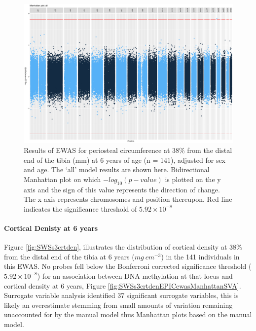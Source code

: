 \documentclass[
]{book}
\begin{document}
\begin{figure}

{\centering \includegraphics[width=0.8\linewidth]{figs/SWSs3pericEPICewasManhattanAll} 

}

\caption{Results of EWAS for periosteal circumference at 38\% from the distal end of the tibia (mm) at 6 years of age (n = 141), adjusted for sex and age. The `all' model results are shown here. Bidirectional Manhattan plot on which \(-log_{10}(p-value)\) is plotted on the y axis and the sign of this value represents the direction of change. The x axis represents chromosomes and position thereupon. Red line indicates the significance threshold of \(5.92\times10^{-8}\)}\label{fig:SWSs3pericEPICewasManhattanSVA}
\end{figure}



\hypertarget{cortical-denisty-at-6-years}{%
\paragraph{Cortical Denisty at 6 years}\label{cortical-denisty-at-6-years}}

Figure \ref{fig:SWSs3crtden}, illustrates the distribution of cortical density at 38\% from the distal end of the tibia at 6 years (\(mg~cm^{-3}\)) in the 141 individuals in this EWAS.
No probes fell below the Bonferroni corrected significance threshold (\(5.92\times10^{-8}\)) for an association between DNA methylation at that locus and cortical density at 6 years, Figure \ref{fig:SWSs3crtdenEPICewasManhattanSVA}.
Surrogate variable analysis identified 37 significant surrogate variables, this is likely an overestimate stemming from small amounts of variation remaining unaccounted for by the manual model thus Manhattan plots based on the manual model.
\end{document}
